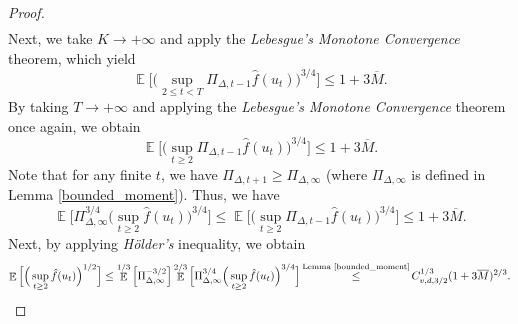 \documentclass{article} %
\DeclareMathOperator{\Expect}{\mathbb{E}}
\newcommand{\I}{\mathbb{I}}
\DeclareMathOperator{\Pro}{\mathbb{P}}
\begin{document}
\begin{proof}
\begin{align*}
\end{align*}
Next, we take \(K \rightarrow +\infty\) and apply the \emph{Lebesgue's Monotone Convergence} theorem, which yield
\[ \Expect\Big[\Big(\sup_{2\le t<T}\Pi_{\Delta,t-1}\hat{f}(u_{t})\Big)^{3/4}\Big]\le 1+3\overline{M}.\]
By taking $T \rightarrow +\infty$ and applying the \emph{Lebesgue's Monotone Convergence} theorem once again, we obtain
\[\Expect\Big[\Big(\sup_{t\ge 2}\Pi_{\Delta,t-1}\hat{f}(u_{t})\Big)^{3/4}\Big]\le 1+3\overline{M}.\]
Note that for any finite $t$, we have $\Pi_{\Delta,t+1} \geq \Pi_{\Delta,\infty}$ (where $\Pi_{\Delta,\infty}$ is defined in Lemma \ref{bounded_moment}). Thus, we have
\[\Expect\Big[\Pi^{3/4}_{\Delta,\infty}\Big(\sup_{t\ge 2}\hat{f}(u_{t})\Big)^{3/4}\Big] \le \Expect\Big[\Big(\sup_{t\ge 2}\Pi_{\Delta,t-1}\hat{f}(u_{t})\Big)^{3/4}\Big]\le 1+3\overline{M}.\]
Next, by applying \emph{Hölder's} inequality, we obtain
\[
\Expect\Big[\Big(\sup_{t\ge 2}\hat{f}(u_{t})\Big)^{1/2}\Big]\le \Expect^{1/3}\Big[\Pi^{-3/2}_{\Delta,\infty}\Big]\Expect^{2/3}\Big[\Pi^{3/4}_{\Delta,\infty}\Big(\sup_{t\ge 2}\hat{f}(u_{t})\Big)^{3/4}\Big]\mathop{\le}^{\text{Lemma \ref{bounded_moment}}}C^{1/3}_{v,d,3/2}(1+3\overline{M})^{2/3}.
\]
\end{proof}
\end{document}

